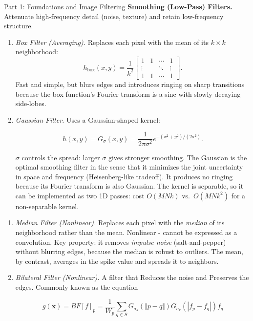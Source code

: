 \documentclass[letterpaper]{article}
\begin{document}
\begin{notes}{Part 1: Foundations and Image Filtering}
\textbf{Smoothing (Low-Pass) Filters.} Attenuate high-frequency detail (noise, texture) and retain low-frequency structure.

\begin{enumerate}
    \item \textit{Box Filter (Averaging).} Replaces each pixel with the mean of its $k\times k$ neighborhood:
    $$h_{\text{box}}(x,y) = \frac{1}{k^2}\begin{bmatrix}1&1&\cdots&1\\\vdots&&\ddots&\vdots\\1&1&\cdots&1\end{bmatrix}.$$
    Fast and simple, but blurs edges and introduces ringing on sharp transitions because the box function's Fourier transform is a sinc with slowly decaying side-lobes.\\
    
    \item \textit{Gaussian Filter.} Uses a Gaussian-shaped kernel:
    
    $$h(x,y)=G_\sigma(x,y) = \frac{1}{2\pi\sigma^2}e^{-(x^2+y^2)/(2\sigma^2)}.$$
    
    $\sigma$ controls the spread: larger $\sigma$ gives stronger smoothing. The Gaussian is the optimal smoothing filter in the sense that it minimizes the joint uncertainty in space and frequency (Heisenberg-like tradeoff). It produces no ringing because its Fourier transform is also Gaussian. The kernel is separable, so it can be implemented as two 1D passes: cost $O(MNk)$ vs.\ $O(MNk^2)$ for a non-separable kernel.
\end{enumerate}



\begin{enumerate}
    \item \textit{Median Filter (Nonlinear).} Replaces each pixel with the \emph{median} of its neighborhood rather than the mean. Nonlinear - cannot be expressed as a convolution. Key property: it removes \emph{impulse noise} (salt-and-pepper) without blurring edges, because the median is robust to outliers. The mean, by contrast, averages in the spike value and spreads it to neighbors.

    \item \textit{Bilateral Filter (Nonlinear).} A filter that Reduces the noise and Preserves the edges. Commonly known as the equation

    $$g(\mathbf{x}) = BF[f]_p= \frac{1}{W_p}\sum_{q\in S}G_{\sigma_s}\left( \Vert p -q \Vert \right)G_{\sigma_r}\left(|f_p - f_q|\right)f_q$$


\end{enumerate}
\end{notes}
\end{document}
